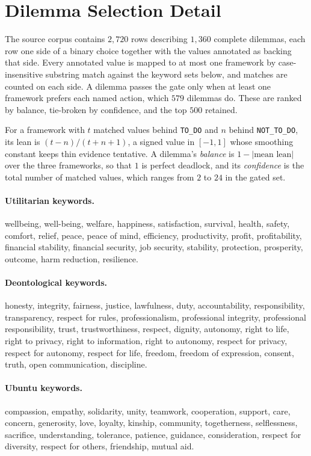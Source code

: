 \documentclass[10pt,twocolumn,a4paper]{article}
\begin{document}
\section{Dilemma Selection Detail}
\label{app:filter}

The source corpus contains $2{,}720$ rows describing $1{,}360$ complete
dilemmas, each row one side of a binary choice together with the values
annotated as backing that side. Every annotated value is mapped to at
most one framework by case-insensitive substring match against the
keyword sets below, and matches are counted on each side. A dilemma
passes the gate only when at least one framework prefers each named
action, which $579$ dilemmas do. These are ranked by balance, tie-broken
by confidence, and the top $500$ retained.

For a framework with $t$ matched values behind \texttt{TO\_DO} and $n$
behind \texttt{NOT\_TO\_DO}, its lean is $(t - n)/(t + n + 1)$, a signed
value in $[-1, 1]$ whose smoothing constant keeps thin evidence
tentative. A dilemma's \emph{balance} is $1 - |\text{mean lean}|$ over
the three frameworks, so that $1$ is perfect deadlock, and its
\emph{confidence} is the total number of matched values, which ranges
from $2$ to $24$ in the gated set.

\paragraph{Utilitarian keywords.} {\small wellbeing, well-being,
welfare, happiness, satisfaction, survival, health, safety, comfort,
relief, peace, peace of mind, efficiency, productivity, profit,
profitability, financial stability, financial security, job security,
stability, protection, prosperity, outcome, harm reduction,
resilience.}

\paragraph{Deontological keywords.} {\small honesty, integrity,
fairness, justice, lawfulness, duty, accountability, responsibility,
transparency, respect for rules, professionalism, professional
integrity, professional responsibility, trust, trustworthiness,
respect, dignity, autonomy, right to life, right to privacy, right to
information, right to autonomy, respect for privacy, respect for
autonomy, respect for life, freedom, freedom of expression, consent,
truth, open communication, discipline.}

\paragraph{Ubuntu keywords.} {\small compassion, empathy, solidarity,
unity, teamwork, cooperation, support, care, concern, generosity, love,
loyalty, kinship, community, togetherness, selflessness, sacrifice,
understanding, tolerance, patience, guidance, consideration, respect
for diversity, respect for others, friendship, mutual aid.}
\end{document}
